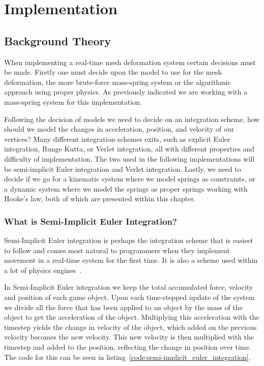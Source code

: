 \chapter{Implementation}
\section{Background Theory}
\label{chap:implementation}
When implementing a real-time mesh deformation system certain decisions must be made.
Firstly one must decide upon the model to use for the mesh deformation, the more brute-force mass-spring system or the algorithmic approach using proper physics.
As previously indicated we are working with a mass-spring system for this implementation.

Following the decision of models we need to decide on an integration scheme, how should we model the changes in acceleration, position, and velocity of our vertices?
Many different integration schemes exits, such as explicit Euler integration, Runge Kutta, or Verlet integration, all with different properties and difficulty of implementation.
The two used in the following implementations will be semi-implicit Euler integration and Verlet integration.
Lastly, we need to decide if we go for a kinematic system where we model springs as constraints, 
or a dynamic system where we model the springs as proper springs working with Hooke's law\cite{math_for_games}, both of which are presented within this chapter.

\subsection{What is Semi-Implicit Euler Integration?}
Semi-Implicit Euler integration is perhaps the integration scheme that is easiest to follow and comes most natural to programmers when they implement
movement in a real-time system for the first time. It is also a scheme used within a lot of physics engines~\cite{gafferongames_integration}.

In Semi-Implicit Euler integration we keep the total accumulated force, velocity and position of each game object.
Upon each time-stepped update of the system we divide all the force that has been applied to an object by the mass of the object to get the acceleration of the object.
Multiplying this acceleration with the timestep yields the change in velocity of the object, which added on the previous velocity becomes the new velocity.
This new velocity is then multiplied with the timestep and added to the position, reflecting the change in position over time.
The code for this can be seen in listing~\ref{code:semi-implicit_euler_integration}.

